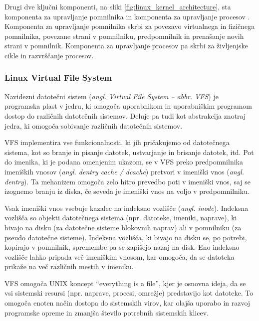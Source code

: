 \documentclass[a4paper,12pt,openright]{book}
\begin{document}
Drugi dve ključni komponenti, na sliki \ref{fig:linux_kernel_architecture}, sta komponenta za upravljanje pomnilnika in komponenta za upravljanje procesov \cite{Tanenbaum_Bos_2023}.
Komponenta za upravljanje pomnilnika skrbi za povezavo virtualnega in fizičnega pomnilnika, povezane strani v pomnilniku, predpomnilnik in prenašanje novih strani v pomnilnik.
Komponenta za upravljanje procesov pa skrbi za življenjske cikle in razvrščanje procesov.

\subsubsection{Linux Virtual File System} \label{ssec:linux:vfs}

Navidezni datotečni sistem (\textit{angl. Virtual File System -- abbr. VFS}) je programska plast v jedru, ki omogoča uporabnikom in uporabniškim programom dostop do različnih datotečnih sistemov.
Deluje pa tudi kot abstrakcija znotraj jedra, ki omogoča sobivanje različnih datotečnih sistemov.

VFS \cite{Linux_kernel_docs_LVFS} implementira vse funkcionalnosti, ki jih pričakujemo od datotečnega sistema, kot so branje in pisanje datotek, ustvarjanje in brisanje datotek, itd.
Pot do imenika, ki je podana omenjenim ukazom, se v VFS preko predpomnilnika imeniških vnosov (\textit{angl. dentry cache / dcache}) pretvori v imeniški vnos (\textit{angl. dentry}).
Ta mehanizem omogoča zelo hitro prevedbo poti v imeniški vnos, saj se izognemo branju iz diska, če seveda je imeniški vnos na voljo v predpomnilniku.

Vsak imeniški vnos vsebuje kazalec na indeksno vozlišče (\textit{angl. inode}). Indeksna vozlišča so objekti datotečnega sistema (npr. datoteke, imeniki, naprave), ki bivajo na disku (za datotečne sisteme blokovnih naprav) ali v pomnilniku (za pseudo datotečne sisteme).
Indeksna vozlišča, ki bivajo na disku se, po potrebi, kopirajo v pomnilnik, spremembe pa se zapišejo nazaj na disk.
Eno indeksno vozlišče lahko pripada več imeniškim vnosom, kar omogoča, da se datoteka prikaže na več različnih mestih v imeniku.

VFS omogoča UNIX koncept ``everything is a file'', kjer je osnovna ideja, da se vsi sistemski resursi (npr. naprave, procesi, omrežje) predstavijo kot datoteke.
To omogoča enoten način dostopa do sistemskih virov, kar olajša uporabo in razvoj programske opreme in zmanjša število potrebnih sistemskih klicev.
\end{document}
